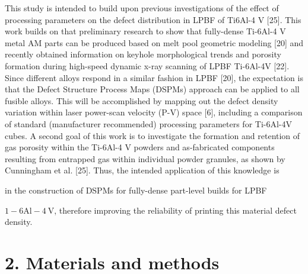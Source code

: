\documentclass[10pt]{article}
\begin{document}
This study is intended to build upon previous investigations of the effect of processing parameters on the defect distribution in LPBF of Ti6Al-4 V [25]. This work builds on that preliminary research to show that fully-dense Ti-6Al-4 V metal AM parts can be produced based on melt pool geometric modeling [20] and recently obtained information on keyhole morphological trends and porosity formation during high-speed dynamic x-ray scanning of LPBF Ti-6Al-4V [22]. Since different alloys respond in a similar fashion in LPBF [20], the expectation is that the Defect Structure Process Maps (DSPMs) approach can be applied to all fusible alloys. This will be accomplished by mapping out the defect density variation within laser power-scan velocity (P-V) space [6], including a comparison of standard (manufacturer recommended) processing parameters for Ti-6Al-4V cubes. A second goal of this work is to investigate the formation and retention of gas porosity within the Ti-6Al-4 V powders and as-fabricated components resulting from entrapped gas within individual powder granules, as shown by Cunningham et al. [25]. Thus, the intended application of this knowledge is

in the construction of DSPMs for fully-dense part-level builds for LPBF

$1-6 \mathrm{Al}-4 \mathrm{~V}$, therefore improving the reliability of printing this material defect density.

\section*{2. Materials and methods}
\end{document}
